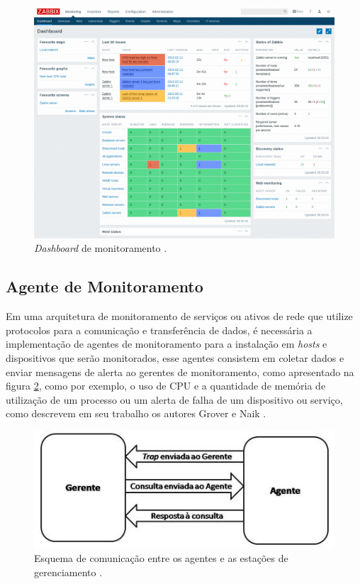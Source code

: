 \begin{figure}[H]
	\begin{center}
	\includegraphics[scale = 0.80]{img/dashboard.png}
		\caption{\textit{Dashboard} de monitoramento \cite{zabbix}.}
		\label{fun:fig:zabbix}
	\end{center}
\end{figure}


\subsection{Agente de Monitoramento}

Em uma arquitetura de monitoramento de serviços ou ativos de rede que utilize protocolos para a comunicação e transferência de dados, é necessária a implementação de agentes de monitoramento para a instalação em \textit{hosts} e dispositivos que serão monitorados, esse agentes consistem em coletar dados e enviar mensagens de alerta ao gerentes de monitoramento, como  apresentado na figura \ref{fun:fig:agente}, como por exemplo, o uso de \acrshort{CPU} e a quantidade de memória de utilização de um processo ou um alerta de falha de um dispositivo ou serviço, como descrevem em seu trabalho os autores Grover e Naik \cite{7439952}.  

\begin{figure}[H]
	\begin{center}
	\includegraphics[scale = 0.80]{img/image004.jpg}
		\caption{Esquema de comunicação entre os agentes e as estações de gerenciamento \cite{snmpagentimage}.}
		\label{fun:fig:agente}
	\end{center}
\end{figure}

